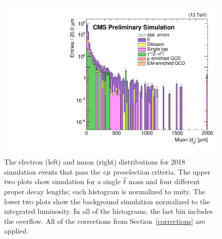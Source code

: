 \begin{figure}[hbtp]
\includegraphics[scale=0.3]{figures/selection/preselection/bg/muonAbsD0_2000um.pdf}
\caption{The electron (left) and muon (right) \ad distributions for 2018 simulation events that pass the $e{\mu}$ preselection criteria. The upper two plots show \stoptolb simulation for a single $\widetilde{t}$ mass and four different proper decay lengths; each histogram is normalized to unity. The lower two plots show the background simulation normalized to the integrated luminosity. In all of the histograms, the last bin includes the overflow. All of the corrections from Section~\ref{corrections} are applied.}
\label{preselection_d0}
\end{figure}